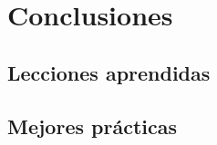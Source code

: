 \chapter{Conclusiones}
\label{chapter:conclusions}

\section{Lecciones aprendidas}
\label{section:lecciones-aprendidas}

\section{Mejores prácticas}
\label{section:mejores-practicas}
